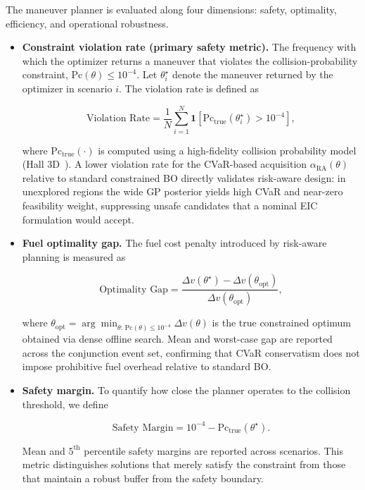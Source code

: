 \documentclass[10pt]{article}
\begin{document}
The maneuver planner is evaluated along four dimensions: safety, optimality, efficiency, and operational robustness.

\begin{itemize}

\item \textbf{Constraint violation rate (primary safety metric).}  
The frequency with which the optimizer returns a maneuver that violates the collision-probability constraint,
$
\text{Pc}(\theta) \le 10^{-4}.
$
Let $\theta_i^\star$ denote the maneuver returned by the optimizer in scenario $i$.  
The violation rate is defined as

\[
\text{Violation Rate}
=
\frac{1}{N}\sum_{i=1}^{N}
\mathbf{1}
\!\left[
\text{Pc}_{\text{true}}(\theta_i^\star) > 10^{-4}
\right],
\]

where $\text{Pc}_{\text{true}}(\cdot)$ is computed using a high-fidelity collision probability model (Hall 3D~\cite{hall2021_3dnc}).  
A lower violation rate for the CVaR-based acquisition $\alpha_{\text{RA}}(\theta)$ relative to standard constrained BO directly validates risk-aware design: in unexplored regions the wide GP posterior yields high CVaR and near-zero feasibility weight, suppressing unsafe candidates that a nominal EIC formulation would accept.
\item \textbf{Fuel optimality gap.}  
The fuel cost penalty introduced by risk-aware planning is measured as

\[
\text{Optimality Gap}
=
\frac{\Delta v(\theta^\star) - \Delta v(\theta_{\text{opt}})}
{\Delta v(\theta_{\text{opt}})},
\]

where $\theta_{\text{opt}} = \arg\min_{\theta:\,\text{Pc}(\theta)\leq 10^{-4}} \Delta v(\theta)$ is the true constrained optimum obtained via dense offline search. Mean and worst-case gap are reported across the conjunction event set, confirming that CVaR conservatism does not impose prohibitive fuel overhead relative to standard BO.

\item \textbf{Safety margin.}  
To quantify how close the planner operates to the collision threshold, we define

\[
\text{Safety Margin}
=
10^{-4} - \text{Pc}_{\text{true}}(\theta^\star).
\]

Mean and $5^{\text{th}}$ percentile safety margins are reported across scenarios.  
This metric distinguishes solutions that merely satisfy the constraint from those that maintain a robust buffer from the safety boundary.


\end{itemize}
\end{document}
